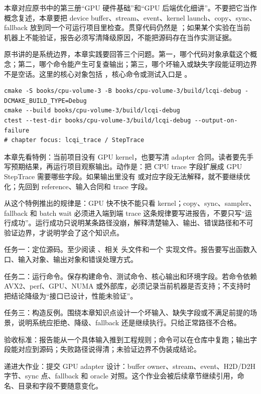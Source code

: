 
本章对应原书中的第三册“GPU 硬件基础”和“GPU 后端优化细讲”。不要把它当作概念复述，本章要把 device buffer、stream、event、kernel launch、copy、sync、fallback 放到同一个可运行项目里检查。贯穿代码仍然是 ；如果某个实验在当前机器上不能验证，报告必须写清降级原因，不能把源码存在当作实测证据。


原书讲的是系统边界，本章实践要回答三个问题。第一，哪个代码对象承载这个概念；第二，哪个命令能产生可复查输出；第三，哪个坏输入或缺失字段能证明边界不是空话。这里的核心对象包括 ，核心命令或测试入口是 。

\begin{lstlisting}[numbers=none,caption={第 14 章实践：GPU 后端边界、copy 与同步成本 的最小命令入口}]
cmake -S books/cpu-volume-3 -B books/cpu-volume-3/build/lcqi-debug -DCMAKE_BUILD_TYPE=Debug
cmake --build books/cpu-volume-3/build/lcqi-debug
ctest --test-dir books/cpu-volume-3/build/lcqi-debug --output-on-failure
# chapter focus: lcqi_trace / StepTrace
\end{lstlisting}


本章先看特例：当前项目没有 GPU kernel，也要写清 adapter 合同。读者要先手写预期结果，再运行项目观察输出。动作是：把 CPU trace 字段扩展成 GPU StepTrace 需要哪些字段。如果输出里没有  或对应字段无法解释，就不要继续优化；先回到 reference、输入合同和 trace 字段。

从这个特例推出的规律是：GPU 快不快不能只看 kernel；copy、sync、sampler、fallback 和 batch wait 必须进入端到端 trace 这条规律要写进报告，不要只写“运行成功”。运行成功只说明某条路径没崩，解释清楚输入、输出、错误路径和不可验证边界，才说明学会了这个知识点。


任务一：定位源码。至少阅读 、相关  头文件和一个  实现文件。报告要写出函数入口、输入对象、输出对象和错误处理方式。

任务二：运行命令。保存构建命令、测试命令、核心输出和环境字段。若命令依赖 AVX2、perf、GPU、NUMA 或外部库，必须记录当前机器是否支持；不支持时把结论降级为“接口已设计，性能未验证”。

任务三：构造反例。围绕本章知识点设计一个坏输入、缺失字段或不满足前提的场景，说明系统应拒绝、降级、fallback 还是继续执行。只给正常路径不合格。


验收标准：报告能从一个具体输入推到工程规则；命令可以在仓库中复跑；输出字段能对应到源码；失败路径说得清；未验证边界不伪装成结论。

递进大作业：提交 GPU adapter 设计：buffer owner、stream、event、H2D/D2H 字节、sync 点、fallback 和 oracle 对照。这个作业会被后续章节继续引用，命名、目录和字段不要随意变化。
